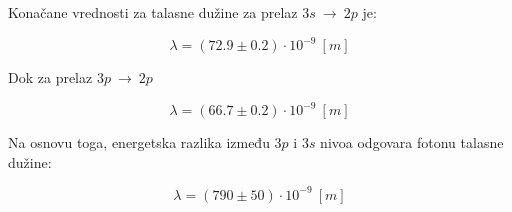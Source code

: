 \documentclass[12pt,a4paper]{article}
\begin{document}
Konačane vrednosti za talasne dužine za prelaz $3s\ \rightarrow\ 2p$ je:

\begin{equation}
\lambda = \left( 72.9 \pm 0.2\right) \cdot 10^{-9}\ [m]
\end{equation}



Dok za prelaz $3p\ \rightarrow\ 2p$


\begin{equation}
\lambda = \left( 66.7 \pm 0.2\right) \cdot 10^{-9}\ [m]
\end{equation}

Na osnovu toga, energetska razlika između $3p$ i $3s$ nivoa odgovara fotonu talasne dužine:

\begin{equation}
\lambda = \left( 790 \pm 50\right) \cdot 10^{-9}\ [m]
\end{equation}
\end{document}
